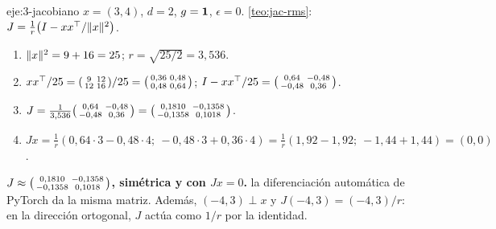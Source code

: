 \begin{solucion}{eje:3-jacobiano}
\datos $x=(3,4)$, $d=2$, $g=\mathbf{1}$, $\epsilon=0$.
\planteamiento \cref{teo:jac-rms}: $J=\frac1r\bigl(I-xx^{\top}/\lVert x\rVert^{2}\bigr)$.
\pasos
\begin{enumerate}[label=\arabic*.]
  \item $\lVert x\rVert^{2}=9+16=25$; $r=\sqrt{25/2}=3{,}536$.
  \item $xx^{\top}/25=\begin{psmallmatrix}9&12\\12&16\end{psmallmatrix}/25=\begin{psmallmatrix}0{,}36&0{,}48\\0{,}48&0{,}64\end{psmallmatrix}$; $I-xx^{\top}/25=\begin{psmallmatrix}0{,}64&-0{,}48\\-0{,}48&0{,}36\end{psmallmatrix}$.
  \item $J=\frac{1}{3{,}536}\begin{psmallmatrix}0{,}64&-0{,}48\\-0{,}48&0{,}36\end{psmallmatrix}=\begin{psmallmatrix}0{,}1810&-0{,}1358\\-0{,}1358&0{,}1018\end{psmallmatrix}$.
  \item $Jx=\frac1r(0{,}64\cdot 3-0{,}48\cdot 4;\ -0{,}48\cdot 3+0{,}36\cdot 4)=\frac1r(1{,}92-1{,}92;\ -1{,}44+1{,}44)=(0,0)$.
\end{enumerate}
\resultado \textbf{$J\approx\begin{psmallmatrix}0{,}1810&-0{,}1358\\-0{,}1358&0{,}1018\end{psmallmatrix}$, simétrica y con $Jx=0$.}
\comprobacion la diferenciación automática de PyTorch da la misma matriz. Además, $(-4,3)\perp x$ y $J(-4,3)=(-4,3)/r$: en la dirección ortogonal, $J$ actúa como $1/r$ por la identidad.
\end{solucion}

